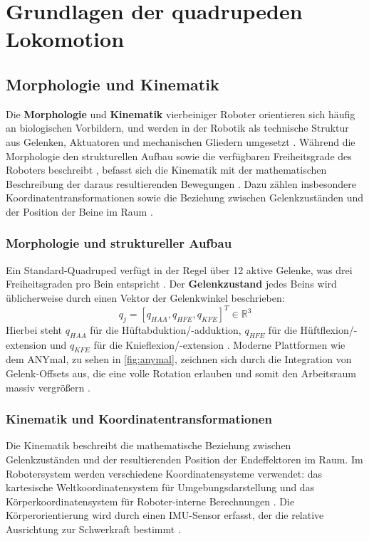 \section{Grundlagen der quadrupeden Lokomotion}
\subsection{Morphologie und Kinematik}
Die \textbf{Morphologie} und \textbf{Kinematik} vierbeiniger Roboter orientieren sich häufig an biologischen Vorbildern, und werden in der Robotik als technische Struktur aus Gelenken, Aktuatoren und mechanischen Gliedern umgesetzt \cite{BISWAL20212017, hutterANYmalHighlyMobile2016}. Während die Morphologie den strukturellen Aufbau sowie die verfügbaren Freiheitsgrade des Roboters beschreibt \cite{BISWAL20212017, heessEmergenceLocomotionBehaviours2017, hutterANYmalHighlyMobile2016}, befasst sich die Kinematik mit der mathematischen Beschreibung der daraus resultierenden Bewegungen \cite{hwangboLearningAgileDynamic2019, bussolaGuidedReinforcementLearning2025, rechtTourReinforcementLearning2018}. Dazu zählen insbesondere Koordinatentransformationen sowie die Beziehung zwischen Gelenkzuständen und der Position der Beine im Raum \cite{hwangboLearningAgileDynamic2019, bussolaGuidedReinforcementLearning2025}.

\subsubsection{Morphologie und struktureller Aufbau}
Ein Standard-Quadruped verfügt in der Regel über 12 aktive Gelenke, was drei Freiheitsgraden pro Bein entspricht \cite{hwangboLearningAgileDynamic2019, BISWAL20212017}. Der \textbf{Gelenkzustand} jedes Beins wird üblicherweise durch einen Vektor der Gelenkwinkel beschrieben:
\begin{equation}
	q_j = [q_{HAA}, q_{HFE}, q_{KFE}]^T \in \mathbb{R}^3
\end{equation}
Hierbei steht $q_{HAA}$ für die Hüftabduktion/-adduktion, $q_{HFE}$ für die Hüftflexion/-extension und $q_{KFE}$ für die Knieflexion/-extension \cite{hwangboLearningAgileDynamic2019, hutterANYmalHighlyMobile2016}. Moderne Plattformen wie dem ANYmal, zu sehen in \autoref{fig:anymal}, zeichnen sich durch die Integration von Gelenk-Offsets aus, die eine volle Rotation erlauben und somit den Arbeitsraum massiv vergrößern \cite{hutterANYmalHighlyMobile2016}.

\subsubsection{Kinematik und Koordinatentransformationen}
Die Kinematik beschreibt die mathematische Beziehung zwischen Gelenkzuständen und der resultierenden Position der Endeffektoren im Raum. Im Robotersystem werden verschiedene Koordinatensysteme verwendet: das kartesische Weltkoordinatensystem für Umgebungsdarstellung und das Körperkoordinatensystem für Roboter-interne Berechnungen \cite{hwangboLearningAgileDynamic2019}. Die Körperorientierung wird durch einen IMU-Sensor erfasst, der die relative Ausrichtung zur Schwerkraft bestimmt \cite{hwangboLearningAgileDynamic2019}.

